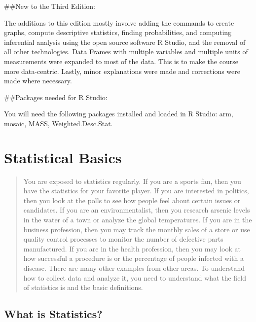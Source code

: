 \documentclass[]{book}
\begin{document}
\#\#New to the Third Edition:

The additions to this edition mostly involve adding the commands to create graphs, compute descriptive statistics, finding probabilities, and computing inferential analysis using the open source software R Studio, and the removal of all other technologies. Data Frames with multiple variables and multiple units of measurements were expanded to most of the data. This is to make the course more data-centric. Lastly, minor explanations were made and corrections were made where necessary.

\#\#Packages needed for R Studio:

You will need the following packages installed and loaded in R Studio: arm, mosaic, MASS, Weighted.Desc.Stat.

\hypertarget{statistical-basics}{%
\chapter{Statistical Basics}\label{statistical-basics}}

\begin{quote}
You are exposed to statistics regularly. If you are a sports fan, then you have the statistics for your favorite player. If you are interested in politics, then you look at the polls to see how people feel about certain issues or candidates. If you are an environmentalist, then you research arsenic levels in the water of a town or analyze the global temperatures. If you are in the business profession, then you may track the monthly sales of a store or use quality control processes to monitor the number of defective parts manufactured. If you are in the health profession, then you may look at how successful a procedure is or the percentage of people infected with a disease. There are many other examples from other areas. To understand how to collect data and analyze it, you need to understand what the field of statistics is and the basic definitions.
\end{quote}

\hypertarget{what-is-statistics}{%
\section{What is Statistics?}\label{what-is-statistics}}
\end{document}
